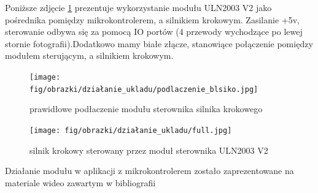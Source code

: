 \documentclass[11pt, a4paper]{article}
\begin{document}
Poniższe zdjęcie \ref{fig:rysunek} prezentuje wykorzystanie modułu ULN2003 V2 jako pośrednika pomiędzy mikrokontrolerem, a silnikiem krokowym. Zasilanie +5v, sterowanie odbywa się za pomocą IO portów (4 przewody wychodzące po lewej stornie fotografii).Dodatkowo mamy białe złącze, stanowiące połączenie pomiędzy modułem sterującym, a silnikiem krokowym.


\begin{figure}[h!]
    \centering
    \texttt{[image: fig/obrazki/działanie\_ukladu/podlaczenie\_blsiko.jpg]}
    \caption{prawidłowe podłaczenie modułu sterownika silnika krokowego}
    \label{fig:rysunek}
\end{figure}

\vspace{0.5cm}
\begin{figure}[h!]
    \centering
    \texttt{[image: fig/obrazki/działanie\_ukladu/full.jpg]}
    \caption{silnik krokowy sterowany przez moduł sterownika ULN2003 V2}
    \label{fig:my_label}
\end{figure}
\vspace{0.5cm}
Działanie modułu w aplikacji z mikrokontrolerem zostało zaprezentowane na materiale wideo zawartym w bibliografii %






\printbibliography[heading=bibintoc]
\end{document}
